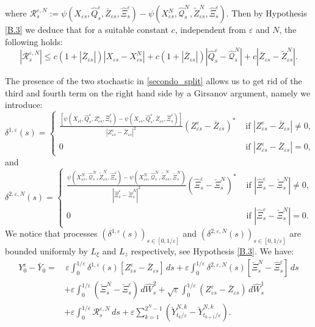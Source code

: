 \documentclass[reqno,a4paper,11 pt]{article}
\def \e {\varepsilon}
\numberwithin{equation}{section}
\begin{document}
where  $ {\mathcal{R}}^{\e,N}_s := \psi({X}_{\e s},\hat{Q}^{\e}_{s},\bar{Z}_{\e s},\hat{\Xi}^\e_s) - \psi({X}^N_{\e s},\hat{\mathcal{Q}}^{N}_{s},\widetilde{Z}^N_{\e s},\hat{\Xi}^\e_s)$.
Then by  Hypothesis \ref{B.3}   we deduce that for a suitable constant $c$, independent from $\e$ and $N$, the following holds:
\begin{equation}\label{primoterm}
|\mathcal{R}^{\e,N}_s|\leq c (1+|\bar{Z}_{\e s}|)|X_{\e s }-X^N_{\e s}|+c(1+|\bar{Z}_{\e s}|)|\hat{Q}^{\e}_s-\hat{\mathcal{Q}}^N_s|+ c|\bar{Z}_{\e s }-\widetilde{Z}^N_{\e s}|.
\end{equation}

\medskip

\noindent The presence of the two stochastic in \eqref{secondo_split} allows us to get rid of the third and fourth term on the right hand side by  a Girsanov argument, namely we introduce:
\begin{equation}\label{Girsa1}
\delta^{1,\e} (s) = \begin{cases}\displaystyle\frac{[\psi({X}_{\e t},\hat{Q}^{\e}_{s},{Z}^{\e}_{\e s},\hat{\Xi}^\e_s)-\psi({X}_{\e s},\hat{Q}^{\e}_{s},\bar{Z}_{\e s},\hat{\Xi}^\e_s)]}{|{Z}^\e_{\e s} -\bar{Z}_{ \e s}|^2} ({Z}^\e_{\e s} -\bar{Z}_{ \e s})^*& \text { if } |{Z}^\e_{\e s} -\bar{Z}_{\e s}| \not= 0, \\
0 & \text { if } |{Z}^\e_{\e s} -\bar{Z}_{ \e s}| = 0,
 \end{cases}
\end{equation}
and 
\begin{equation}\label{Girsa2}
\delta^{2,\e,N} (s) = \begin{cases}\displaystyle\frac{\psi({X}^N_{\e s},\hat{\mathcal{Q}}^{N}_{s},\widetilde{Z}^N_{\e s},\hat{\Xi}^\e_s)-\psi({X}^N_{\e s},\hat{\mathcal{Q}}^N_s,\widetilde{Z}^N_{\e s},\check{\Xi}^N_s)}{|\hat{\Xi}^\e_s -\check{\Xi}^N_s|^2}(\hat{\Xi}^\e_s -\check{\Xi}^N_s)^* & \text { if } |\hat{\Xi}^\e_s -\check{\Xi}^N_s| \not= 0, \\
0 & \text { if } |\hat{\Xi}^\e_s -\check{\Xi}^N_s|= 0.
 \end{cases}
\end{equation}
We notice that processes $(\delta^{1,\e}(s))_{s\in [0,1/\e]}$ and 
$(\delta^{2,\e, N}(s))_{s\in [0,1/\e]}$ are  bounded uniformly by $L_\xi$ and $L_z$ respectively, see Hypothesis \ref{B.3}. 
We have:
\begin{align*}
Y^\e _0 -\bar Y_0 = & \, \e \int_0^{1/\e} \delta^{1,\e}( s) [Z^\e_{\e s} -\bar{Z}_{\e s}] \, ds +\e \int_0^{1/\e}\delta^{2,\e,N}(s)[\check{\Xi}^{N}_s -\hat{\Xi}^\e_s]\, ds  \\ &
 +  \e \int_0^{1/\e}(\check{\Xi}^{N}_s -\check{\Xi}^\e_s)  \, d{\hat{W}}^2_s  +\sqrt{\e}\int_0^{1/\e} (Z^\e_{\e s}-\bar{Z}_{ \e s})\,d \hat{W}^1_s
\\ & 
 +\e \int_0^{1/\e} {\mathcal{R}}^{\e,N}_s \, ds +\e  \sum_{k=1}^{2^N-1} (\check{Y}^{N,k}_{t_{k}/\e}-\check{Y}^{N,k}_{t_{k+1}/\e }).
\end{align*}
\end{document}
